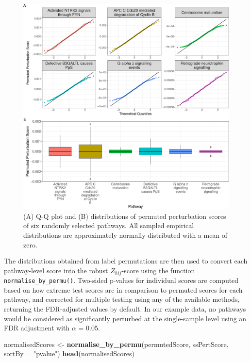 \documentclass[9pt,a4paper,]{extarticle}
\newenvironment{Shaded}{\begin{snugshade}}{\end{snugshade}}
\newcommand{\AttributeTok}[1]{\textcolor[rgb]{0.13,0.29,0.53}{#1}}
\newcommand{\FunctionTok}[1]{\textcolor[rgb]{0.13,0.29,0.53}{\textbf{#1}}}
\newcommand{\NormalTok}[1]{#1}
\newcommand{\OtherTok}[1]{\textcolor[rgb]{0.56,0.35,0.01}{#1}}
\newcommand{\StringTok}[1]{\textcolor[rgb]{0.31,0.60,0.02}{#1}}
\begin{document}
\begin{figure}

{\centering \includegraphics[width=1\linewidth]{sSNAPPY_paper_files/figure-latex/Figure3-1} 

}

\caption{(A) Q-Q plot and (B) distributions of permuted perturbation scores of six randomly selected pathways. All sampled empirical distributions are approximately normally distributed with a mean of zero.}\label{fig:Figure3}
\end{figure}

The distributions obtained from label permutations are then used to convert each pathway-level score into the robust \(Z_{hij}\)-score using the function \texttt{normalise\_by\_permu()}.
Two-sided p-values for individual scores are computed based on how extreme test scores are in comparison to permuted scores for each pathway, and corrected for multiple testing using any of the available methods, returning the FDR-adjusted values by default.
In our example data, no pathways would be considered as significantly perturbed at the single-sample level using an FDR adjustment with \(\alpha\) = 0.05.

\begin{Shaded}
\begin{Highlighting}[]
\NormalTok{normalisedScores }\OtherTok{\textless{}{-}} \FunctionTok{normalise\_by\_permu}\NormalTok{(permutedScore, ssPertScore, }
                                       \AttributeTok{sortBy =} \StringTok{"pvalue"}\NormalTok{)}
\FunctionTok{head}\NormalTok{(normalisedScores)}
\end{Highlighting}
\end{Shaded}
\end{document}
